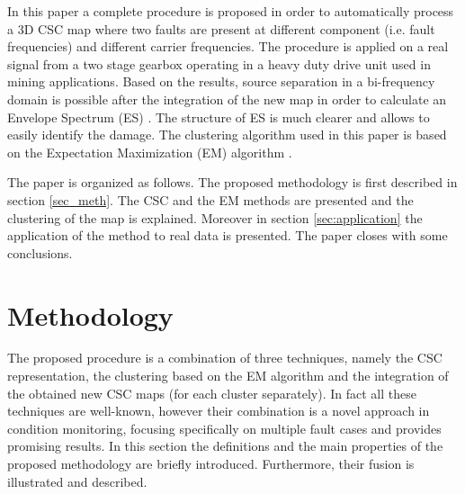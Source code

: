 \documentclass[11pt]{article}
\begin{document}
In this paper a complete procedure is proposed in order to automatically process a 3D CSC map where two faults are present at different component (i.e. fault frequencies) and different carrier frequencies. The procedure is applied on a real signal from a two stage gearbox operating in a heavy duty drive unit used in mining applications. Based on the results, source separation in a bi-frequency domain is possible after the integration of the new map in order to calculate an Envelope Spectrum (ES) \cite{randall2001relationship}. The structure of ES is much clearer and allows to easily identify the damage. The clustering algorithm used in this paper is based on the Expectation Maximization (EM) algorithm \cite{dempster1977maximum, kaufman2009finding}. 

The paper is organized as follows. The proposed methodology is first described in section \ref{sec_meth}. The CSC and the EM methods are presented and the clustering of the map is explained. Moreover in section \ref{sec:application} the application of the method to real data is presented. The paper closes with some conclusions.

\section{Methodology}\label{sec:sec_meth}
The proposed procedure is a combination of three techniques, namely the CSC representation, the clustering based on the EM algorithm and the integration of the obtained new CSC maps (for each cluster separately). In fact all these techniques are well-known, however their combination is a novel approach in condition monitoring, focusing specifically on multiple fault cases and provides promising results. In this section the definitions and the main properties of the proposed methodology are briefly introduced. Furthermore, their fusion is illustrated and described. 
\end{document}
